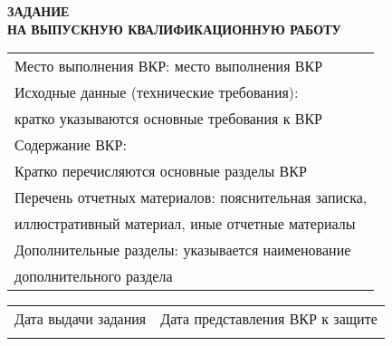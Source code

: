 \begin{center}
	\textbf{
		ЗАДАНИЕ \\
		НА ВЫПУСКНУЮ КВАЛИФИКАЦИОННУЮ РАБОТУ
	}

	\vspace*{2cm}

	\confirmation

	\vspace*{3cm}
	
	\worktitle
	\begin{tabularx}{\textwidth}{ X }
		Место выполнения ВКР: место выполнения ВКР \\
		Исходные данные (технические требования): \\
		кратко указываются основные требования к ВКР \\
		Содержание ВКР: \\
		Кратко перечисляются основные разделы ВКР \\
		Перечень отчетных материалов: пояснительная записка, \\ иллюстративный материал, иные отчетные материалы \\
		Дополнительные разделы: указывается наименование \\ дополнительного раздела
	\end{tabularx}

	\vspace*{2cm}
	
	\begin{tabularx}{\textwidth}{ X X }
		Дата выдачи задания & Дата представления ВКР к защите \\
		\emptydate & \emptydate
	\end{tabularx}

	\vspace*{3cm}

	\subsblock
\end{center}

\thispagestyle{empty}
\clearpage
